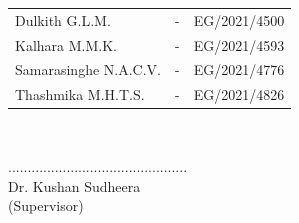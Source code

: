 \begin{center}
\begin{tabular}[h]{lll}
 Dulkith G.L.M.	& - & 	EG/2021/4500\\
 Kalhara M.M.K.	& - & 	EG/2021/4593\\
 Samarasinghe N.A.C.V.	& - & 	EG/2021/4776\\
 Thashmika M.H.T.S. 	& - &	EG/2021/4826
\end{tabular}\\
\vspace{1cm}

\vspace{1cm}

 .............................................. \\
Dr. Kushan Sudheera\\
(Supervisor)

\end{center}

